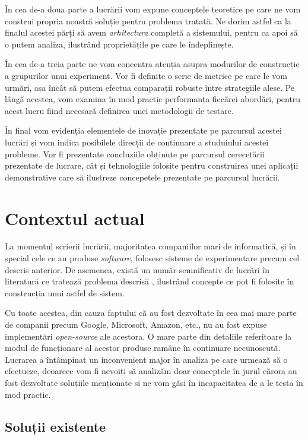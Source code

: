 În cea de-a doua parte a lucrării vom expune conceptele teoretice pe care ne vom construi propria noastră soluție pentru problema tratată. Ne dorim astfel ca la finalul acestei părți să avem \textit{arhitectura} completă a sistemului, pentru ca apoi să o putem analiza, ilustrând proprietățile pe care le îndeplinește.

În cea de-a treia parte ne vom concentra atenția asupra modurilor de construcție a grupurilor unui experiment. Vor fi definite o serie de metrice pe care le vom urmări, așa încât să putem efectua comparații robuste între strategiile alese. Pe lângă acestea, vom examina în mod practic performanța fiecărei abordări, pentru acest lucru fiind necesară definirea unei metodologii de testare.

În final vom evidenția elementele de inovație prezentate pe parcursul acestei lucrări și vom indica posibilele direcții de continuare a studuiului acestei probleme. Vor fi prezentate concluziile obținute pe parcursul cerecetării prezentate de lucrare, cât și tehnologiile folosite pentru construirea unei aplicații demonstrative care să ilustreze concepetele prezentate pe parcursul lucrării.

\section{Contextul actual}

La momentul scrierii lucrării, majoritatea companiilor mari de informatică, și în special cele ce au produse \textit{software}, folosesc sisteme de experimentare precum cel descris anterior. De asemenea, există un număr semnificativ de lucrări în literatură ce tratează problema descrisă \cite{overlapgoogle} \cite{multiarmeconomy}, ilustrând concepte ce pot fi folosite în construcția unui astfel de sistem. 

Cu toate acestea, din cauza faptului că au fost dezvoltate în cea mai mare parte de companii precum Google, Microsoft, Amazon, etc., nu au fost expuse implementări \textit{open-source} ale acestora. O mare parte din detaliile referitoare la modul de funcționare al acestor produse ramâne în continuare necunoscută. Lucrarea a întâmpinat un inconvenient major în analiza pe care urmează să o efectueze, deoarece vom fi nevoiți să analizăm doar conceptele în jurul cărora au fost dezvoltate soluțiile menționate si ne vom găsi în incapacitatea de a le testa în mod practic.

\subsection{Soluții existente}

